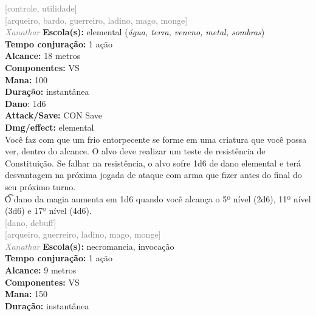 \documentclass{RPG_Adventure}[2021/10/20]
\begin{document}
{\scriptsize \textcolor{gray}{[controle, utilidade]\\}}
{\scriptsize \textcolor{gray}{[arqueiro, bardo, guerreiro, ladino, mago, monge]\\}}
{\tiny \textcolor{gray}{\textit{Xanathar}}}\jump{}
{\small \t \textbf{Escola(s):} elemental (\textit{água, terra, veneno, metal, sombras})\\\t \textbf{Tempo conjuração:} 1 ação\\\t \textbf{Alcance:} 18 metros\\\t \textbf{Componentes:} VS\\\t \textbf{Mana:} 100\\\t \textbf{Duração:} instantânea\\\t \textbf{Dano}: 1d6\\\t \textbf{Attack/Save:} CON Save\\\t \textbf{Dmg/effect:} elemental\\}
{\normalsize Você faz com que um frio entorpecente se forme em uma criatura que você possa ver, dentro do alcance. O alvo deve realizar um teste de resistência de Constituição. Se falhar na resistência, o alvo sofre 1d6 de dano elemental e terá desvantagem na próxima jogada de ataque com arma que fizer antes do final do seu próximo turno.\\\t O dano da magia aumenta em 1d6 quando você alcança o 5º nível (2d6), 11º nível (3d6) e 17º nível (4d6).\\}
{\scriptsize \textcolor{gray}{[dano, debuff]\\}}
{\scriptsize \textcolor{gray}{[arqueiro, guerreiro, ladino, mago, monge]\\}}
{\tiny \textcolor{gray}{\textit{Xanathar}}}\jump{}
{\small \t \textbf{Escola(s):} necromancia, invocação\\\t \textbf{Tempo conjuração:} 1 ação\\\t \textbf{Alcance:} 9 metros\\\t \textbf{Componentes:} VS\\\t \textbf{Mana:} 150\\\t \textbf{Duração:} instantânea\\}
\end{document}
